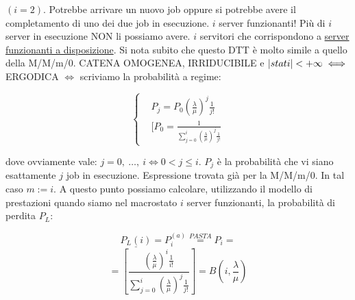 \begin{center}
\end{center}

$(i=2)$. Potrebbe arrivare un nuovo job oppure si potrebbe avere il completamento di uno dei due job in esecuzione. $i$ server funzionanti! Più di $i$ server in esecuzione NON li possiamo avere. $i$ servitori che corrispondono a \underline{server funzionanti a disposizione}. Si nota subito che questo DTT è molto simile a quello della M/M/m/0. CATENA OMOGENEA, IRRIDUCIBILE e $\left\vert{stati}\right\vert<+\infty \iff$ ERGODICA $\iff$ scriviamo la probabilità a regime:

\[
	\left\{
	\begin{aligned}
	&P_j = P_0 (\frac{\lambda}{\mu})^j \frac{1}{j!}\\
	&[P_0 = \frac{1}{\sum_{j=0}^i{(\frac{\lambda}{\mu})^j \frac{1}{j!}}}
	\end{aligned}
	\right.
\]

dove ovviamente vale: $j=0,\ \dots,\ i \iff 0<j\leq i$. $P_j$ è la probabilità che vi siano esattamente $j$ job in esecuzione. Espressione trovata già per la M/M/m/0. In tal caso $m := i$. A questo punto possiamo calcolare, utilizzando il modello di prestazioni quando siamo nel macrostato $i$ server funzionanti, la probabilità di perdita $P_L$:

\[
	\underline{P_L(i)} = \underline{P_i^{(a)} \stackrel{PASTA}{=} P_i} =
\]
\[
	= [\frac{(\frac{\lambda}{\mu})^i \frac{1}{i!}}{\sum_{j=0}^i{(\frac{\lambda}{\mu})^j \frac{1}{j!}}}] = B(i,\frac{\lambda}{\mu})
\]

